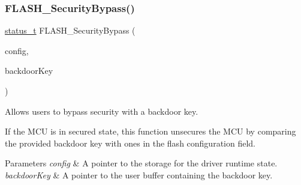 \subsubsection{\texorpdfstring{FLASH\_SecurityBypass()}{FLASH\_SecurityBypass()}}
{\footnotesize\ttfamily \mbox{\hyperlink{group__ksdk__common_gaaabdaf7ee58ca7269bd4bf24efcde092}{status\+\_\+t}} F\+L\+A\+S\+H\+\_\+\+Security\+Bypass (\begin{DoxyParamCaption}\item[{\mbox{\hyperlink{group__ftfx__flash__driver_ga0dfc969e6f9e17c17e60d823565141a5}{flash\+\_\+config\+\_\+t}} $\ast$}]{config,  }\item[{const uint8\+\_\+t $\ast$}]{backdoor\+Key }\end{DoxyParamCaption})}



Allows users to bypass security with a backdoor key. 

If the M\+CU is in secured state, this function unsecures the M\+CU by comparing the provided backdoor key with ones in the flash configuration field.


\begin{DoxyParams}{Parameters}
{\em config} & A pointer to the storage for the driver runtime state. \\
\hline
{\em backdoor\+Key} & A pointer to the user buffer containing the backdoor key.\\
\hline
\end{DoxyParams}

